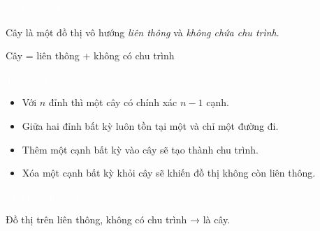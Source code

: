 \documentclass{beamer}
\title{\hlred{Cây — Cây khung — MST}}
\author{Nhóm 3}
\date{\hlcyan{03/2026}}
\newcommand{\hlblue}[1]{\textcolor{myblue}{#1}}
\newcommand{\hlgreen}[1]{\textcolor{mygreen}{#1}}
\newcommand{\hlred}[1]{\textcolor{myred}{#1}}
\newcommand{\hlpurple}[1]{\textcolor{mypurple}{#1}}
\newcommand{\hlorange}[1]{\textcolor{myorange}{#1}}
\newcommand{\hlwhite}[1]{\textcolor{white}{#1}}
\begin{document}
\frame{\titlepage}


\begin{frame}{\hlwhite{Định nghĩa Cây}}
\begin{tcolorbox}[title=\textbf{\hlgreen{Khái niệm}}]
\hlblue{Cây} là một đồ thị vô hướng \emph{\hlgreen{liên thông}} và \emph{\hlred{không chứa chu trình}}.
\end{tcolorbox}

\begin{tcolorbox}
\centering
\hlpurple{Cây = \hlgreen{liên thông} + \hlred{không có chu trình}}
\end{tcolorbox}
\end{frame}


\begin{frame}{\hlwhite{Tính chất của cây}}
\begin{itemize}
  \item Với \hlblue{$n$ đỉnh} thì một cây có chính xác \hlred{$n-1$ cạnh}.
  \item Giữa hai đỉnh bất kỳ luôn tồn tại \hlgreen{một và chỉ một đường đi}.
  \item Thêm một cạnh bất kỳ vào cây sẽ tạo thành \hlred{chu trình}.
  \item Xóa một cạnh bất kỳ khỏi cây sẽ khiến đồ thị \hlorange{không còn liên thông}.
\end{itemize}
\end{frame}


\begin{frame}{\hlwhite{Ví dụ minh họa một cây}}
\centering
{}

\vspace{0.3cm}
\hlpurple{Đồ thị trên liên thông, không có chu trình → là cây.}
\end{frame}
\end{document}
